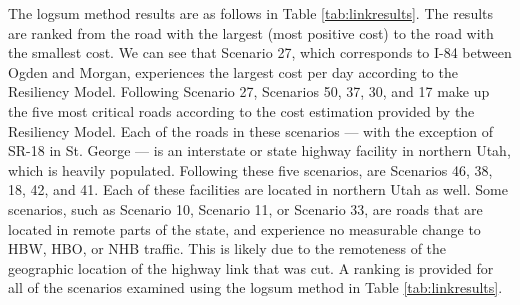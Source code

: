 The logsum method results are as follows in Table \ref{tab:linkresults}.
The results are ranked from the road with the largest (most positive
cost) to the road with the smallest cost. We can see that Scenario 27, which
corresponds to I-84 between Ogden and Morgan, experiences the largest cost
per day according to the Resiliency Model. Following Scenario 27, Scenarios 50, 37, 30,
and 17 make up the five most critical roads according to the cost estimation
provided by the Resiliency Model. Each of the roads in these scenarios --- with the exception
of SR-18 in St. George --- is an interstate or state highway facility in
northern Utah, which is heavily populated. Following these five scenarios, are
Scenarios 46, 38, 18, 42, and 41. Each of these facilities are located in northern Utah as well.
Some scenarios, such as Scenario 10,
Scenario 11, or Scenario 33, are roads that are located in remote parts of the state, and
experience no measurable change to HBW, HBO, or NHB traffic. This is
likely due to the remoteness of the geographic location of the highway
link that was cut. A ranking is provided for all of the scenarios examined
using the logsum method in Table \ref{tab:linkresults}.

